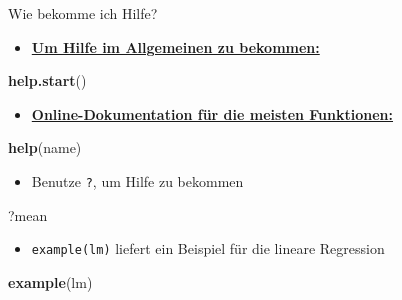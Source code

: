 \documentclass[ignorenonframetext,]{beamer}
\newenvironment{Shaded}{\begin{snugshade}}{\end{snugshade}}
\newcommand{\KeywordTok}[1]{\textcolor[rgb]{0.26,0.66,0.93}{\textbf{#1}}}
\newcommand{\NormalTok}[1]{\textcolor[rgb]{0.74,0.68,0.62}{#1}}
\providecommand{\tightlist}{%
  \setlength{\itemsep}{0pt}\setlength{\parskip}{0pt}}
\begin{document}
\begin{frame}[fragile]{Wie bekomme ich Hilfe?}

\begin{itemize}
\tightlist
\item
  \href{http://itfeature.com/tag/how-to-get-help-in-r}{\textbf{Um Hilfe
  im Allgemeinen zu bekommen:}}
\end{itemize}

\begin{Shaded}
\begin{Highlighting}[]
\KeywordTok{help.start}\NormalTok{()}
\end{Highlighting}
\end{Shaded}

\begin{itemize}
\tightlist
\item
  \href{https://www.r-project.org/help.html}{\textbf{Online-Dokumentation
  für die meisten Funktionen:}}
\end{itemize}

\begin{Shaded}
\begin{Highlighting}[]
\KeywordTok{help}\NormalTok{(name)}
\end{Highlighting}
\end{Shaded}

\begin{itemize}
\tightlist
\item
  Benutze \texttt{?}, um Hilfe zu bekommen
\end{itemize}

\begin{Shaded}
\begin{Highlighting}[]
\NormalTok{?mean}
\end{Highlighting}
\end{Shaded}

\begin{itemize}
\tightlist
\item
  \texttt{example(lm)} liefert ein Beispiel für die lineare Regression
\end{itemize}

\begin{Shaded}
\begin{Highlighting}[]
\KeywordTok{example}\NormalTok{(lm)}
\end{Highlighting}
\end{Shaded}

\end{frame}
\end{document}

